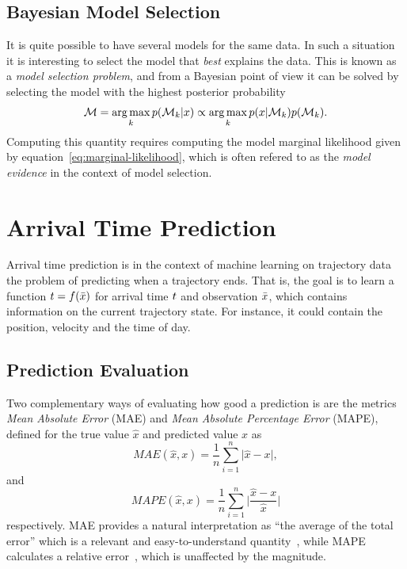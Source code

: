 \subsection{Bayesian Model Selection}
It is quite possible to have several models for the same data. In such a
situation it is interesting to select the model that \textit{best} explains the
data. This is known as a \textit{model selection problem}, and from a
Bayesian point of view it can be solved by selecting the model with
the highest posterior probability
\begin{equation}
  \label{model-posterior-probability}
  \mathcal{M} 
  = \operatorname*{arg\,max}_k p(\mathcal{M}_{k} \vert x) 
  \propto \operatorname*{arg\,max}_k p(x \vert \mathcal{M}_{k})p(\mathcal{M}_{k}).
\end{equation}
Computing this quantity requires computing the model marginal
likelihood given by equation~\ref{eq:marginal-likelihood}, which is
often refered to as the \textit{model evidence} in
the context of model selection.

\section{Arrival Time Prediction}
Arrival time prediction is in the context of machine learning on trajectory 
data the problem of predicting when a trajectory ends. 
That is, the goal is to learn a function $t = f(\bar{x})$ for arrival time $t$ and 
observation $\bar{x}$, which contains information on the current
trajectory state. For instance, it
could contain the position, velocity and the time of day.

\subsection{Prediction Evaluation}
Two complementary ways of evaluating how good a prediction is are the metrics
\textit{Mean Absolute Error} (MAE) and \textit{Mean Absolute Percentage
  Error} (MAPE), defined for the true value $\hat{x}$ and predicted
value $x$ as 
\begin{equation}
  \label{eq:mae}
  MAE(\hat{x}, x) = \frac{1}{n}\sum_{i=1}^{n}{\vert \hat{x} - x \vert},
\end{equation}
and
\begin{equation}
  \label{eq:mape}
  MAPE(\hat{x}, x) = \frac{1}{n}\sum_{i=1}^{n} \vert \frac{\hat{x} - x}{\hat{x}} \vert
\end{equation}
respectively. 
MAE provides a natural interpretation as 
``the average of the total error'' which is a relevant
and easy-to-understand quantity~\cite{willmott2005advantages}, 
while MAPE calculates a relative
error~\cite{Armstrong1992Jun}, which is unaffected by the
magnitude. 

